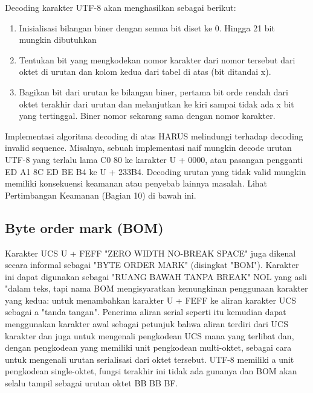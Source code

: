    Decoding karakter UTF-8 akan menghasilkan sebagai berikut:
   \begin{enumerate}
   \item Inisialisasi bilangan biner dengan semua bit diset ke 0. Hingga 21 bit
       mungkin dibutuhkan

   \item Tentukan bit yang mengkodekan nomor karakter dari nomor tersebut
       dari oktet di urutan dan kolom kedua dari tabel
       di atas (bit ditandai x).

   \item Bagikan bit dari urutan ke bilangan biner, pertama
       bit orde rendah dari oktet terakhir dari urutan dan
       melanjutkan ke kiri sampai tidak ada x bit yang tertinggal. Biner
       nomor sekarang sama dengan nomor karakter.
    \end{enumerate}
   Implementasi algoritma decoding di atas HARUS melindungi terhadap
   decoding invalid sequence. Misalnya, sebuah implementasi naif mungkin
   decode urutan UTF-8 yang terlalu lama C0 80 ke karakter U + 0000,
   atau pasangan pengganti ED A1 8C ED BE B4 ke U + 233B4. Decoding
   urutan yang tidak valid mungkin memiliki konsekuensi keamanan atau penyebab lainnya
   masalah. Lihat Pertimbangan Keamanan (Bagian 10) di bawah ini.

	\subsection{Byte order mark (BOM)}
   Karakter UCS U + FEFF "ZERO WIDTH NO-BREAK SPACE" juga dikenal
   secara informal sebagai "BYTE ORDER MARK" (disingkat "BOM"). Karakter ini
   dapat digunakan sebagai "RUANG BAWAH TANPA BREAK" NOL yang asli "dalam teks, tapi
   nama BOM mengisyaratkan kemungkinan penggunaan karakter yang kedua: untuk
   menambahkan karakter U + FEFF ke aliran karakter UCS sebagai a
   "tanda tangan". Penerima aliran serial seperti itu kemudian dapat menggunakan
   karakter awal sebagai petunjuk bahwa aliran terdiri dari UCS
   karakter dan juga untuk mengenali pengkodean UCS mana yang terlibat dan,
   dengan pengkodean yang memiliki unit pengkodean multi-oktet, sebagai cara untuk mengenali urutan serialisasi dari oktet tersebut. UTF-8 memiliki a
   unit pengkodean single-oktet, fungsi terakhir ini tidak ada gunanya dan BOM
   akan selalu tampil sebagai urutan oktet BB BB BF.

